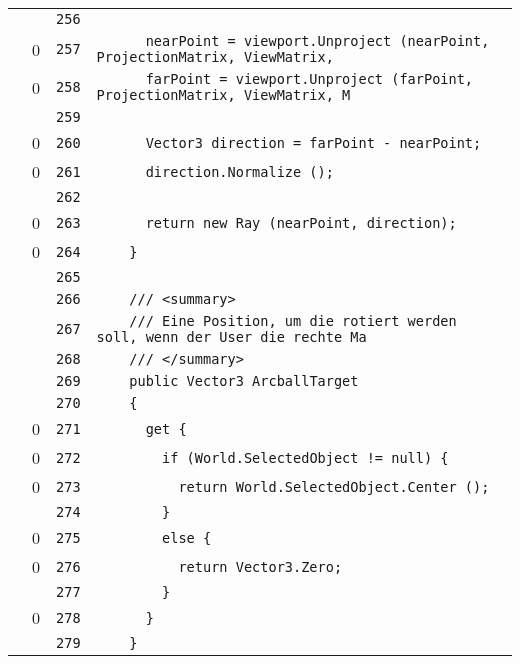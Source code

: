 \documentclass[a4paper,10pt]{article}
\begin{document}
\begin{longtable}[l]{lrrl}
\cellcolor{gray} &  & \verb~256~ & \verb~~\\
\cellcolor{red} & 0 & \verb~257~ & \verb~      nearPoint = viewport.Unproject (nearPoint, ProjectionMatrix, ViewMatrix,~\\
\cellcolor{red} & 0 & \verb~258~ & \verb~      farPoint = viewport.Unproject (farPoint, ProjectionMatrix, ViewMatrix, M~\\
\cellcolor{gray} &  & \verb~259~ & \verb~~\\
\cellcolor{red} & 0 & \verb~260~ & \verb~      Vector3 direction = farPoint - nearPoint;~\\
\cellcolor{red} & 0 & \verb~261~ & \verb~      direction.Normalize ();~\\
\cellcolor{gray} &  & \verb~262~ & \verb~~\\
\cellcolor{red} & 0 & \verb~263~ & \verb~      return new Ray (nearPoint, direction);~\\
\cellcolor{red} & 0 & \verb~264~ & \verb~    }~\\
\cellcolor{gray} &  & \verb~265~ & \verb~~\\
\cellcolor{gray} &  & \verb~266~ & \verb~    /// <summary>~\\
\cellcolor{gray} &  & \verb~267~ & \verb~    /// Eine Position, um die rotiert werden soll, wenn der User die rechte Ma~\\
\cellcolor{gray} &  & \verb~268~ & \verb~    /// </summary>~\\
\cellcolor{gray} &  & \verb~269~ & \verb~    public Vector3 ArcballTarget~\\
\cellcolor{gray} &  & \verb~270~ & \verb~    {~\\
\cellcolor{red} & 0 & \verb~271~ & \verb~      get {~\\
\cellcolor{red} & 0 & \verb~272~ & \verb~        if (World.SelectedObject != null) {~\\
\cellcolor{red} & 0 & \verb~273~ & \verb~          return World.SelectedObject.Center ();~\\
\cellcolor{gray} &  & \verb~274~ & \verb~        }~\\
\cellcolor{red} & 0 & \verb~275~ & \verb~        else {~\\
\cellcolor{red} & 0 & \verb~276~ & \verb~          return Vector3.Zero;~\\
\cellcolor{gray} &  & \verb~277~ & \verb~        }~\\
\cellcolor{red} & 0 & \verb~278~ & \verb~      }~\\
\cellcolor{gray} &  & \verb~279~ & \verb~    }~\\

\end{longtable}
\end{document}
